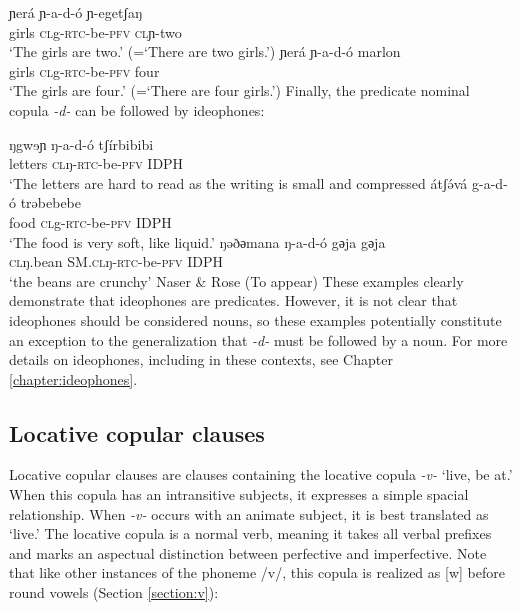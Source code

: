 \ea 
\ea \gll ɲerá ɲ-a-d-ó ɲ-egetʃaŋ\\
girls \textsc{cl}g-\textsc{rtc}-be-\textsc{pfv} \textsc{cl}ɲ-two\\
\glt `The girls are two.' (=`There are two girls.')
\ex \gll ɲerá ɲ-a-d-ó marlon\\
girls \textsc{cl}g-\textsc{rtc}-be-\textsc{pfv} four\\
\glt `The girls are four.' (=`There are four girls.')
\z
\z
Finally, the predicate nominal copula \textit{-d-} can be followed by ideophones:

\ea
	\ea \gll ŋgwɘɲ ŋ-a-d-ó tʃírbibibi\\
			 letters \textsc{cl}ŋ-\textsc{rtc}-be-\textsc{pfv} IDPH\\
		\glt `The letters are hard to read as the writing is small and compressed
	\ex \gll átʃə́vá g-a-d-ó trəbebebe\\
			food \textsc{cl}g-\textsc{rtc}-be-\textsc{pfv} IDPH\\
		\glt `The food is very soft, like liquid.'
	\ex \gll ŋəðәmana ŋ-a-d-ó gәja gәja\\
			\textsc{cl}ŋ.bean SM.\textsc{cl}ŋ-\textsc{rtc}-be-\textsc{pfv} IDPH\\
		\glt ‘the beans are crunchy’ \hfill Naser \& Rose (To appear)
\z 
\z
These examples clearly demonstrate that ideophones are predicates. However, it is not clear that ideophones should be considered nouns, so these examples potentially constitute an exception to the generalization that \textit{-d-} must be followed by a noun. For more details on ideophones, including in these contexts, see Chapter \ref{chapter:ideophones}.



\subsection{Locative copular clauses}\label{section:loccop}

Locative copular clauses are clauses containing the locative copula \textit{-v-} `live, be at.'  When this copula has an intransitive subjects, it expresses a simple spacial relationship. When \textit{-v-} occurs with an animate subject, it is best translated as `live.' The locative copula is a normal verb, meaning it takes all verbal prefixes and marks an aspectual distinction between perfective and imperfective. Note that like other instances of the phoneme /v/, this copula is realized as [w] before round vowels (Section \ref{section:v}):

